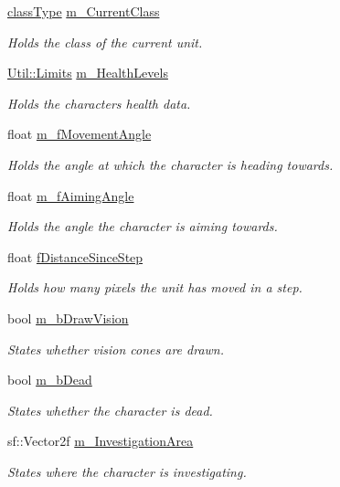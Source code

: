 \begin{DoxyCompactItemize}
\hyperlink{_weapon_8h_ab84a9103ee8e782337e098ae19af7a29}{class\+Type} \hyperlink{class_character_aa130143524b553ddf116e0d4077bcdec}{m\+\_\+\+Current\+Class}
\begin{DoxyCompactList}\small\item\em Holds the class of the current unit. \end{DoxyCompactList}\item 
\hyperlink{struct_util_1_1_limits}{Util\+::\+Limits} \hyperlink{class_character_a944cd240090634db000d5f64ce6345fe}{m\+\_\+\+Health\+Levels}
\begin{DoxyCompactList}\small\item\em Holds the characters health data. \end{DoxyCompactList}\item 
float \hyperlink{class_character_aeb540cb088fdd9d31874cd672d6da8a0}{m\+\_\+f\+Movement\+Angle}
\begin{DoxyCompactList}\small\item\em Holds the angle at which the character is heading towards. \end{DoxyCompactList}\item 
float \hyperlink{class_character_af087fbb16f032166f54f1b8c7d2ac579}{m\+\_\+f\+Aiming\+Angle}
\begin{DoxyCompactList}\small\item\em Holds the angle the character is aiming towards. \end{DoxyCompactList}\item 
float \hyperlink{class_character_af3fba210ee65a1e3792c6bf7388cd8c4}{f\+Distance\+Since\+Step}
\begin{DoxyCompactList}\small\item\em Holds how many pixels the unit has moved in a step. \end{DoxyCompactList}\item 
bool \hyperlink{class_character_a6e68bbc92908c098b35615e7b43ac0b2}{m\+\_\+b\+Draw\+Vision}
\begin{DoxyCompactList}\small\item\em States whether vision cones are drawn. \end{DoxyCompactList}\item 
bool \hyperlink{class_character_a910b476644d4a5c30355d36664b07b5f}{m\+\_\+b\+Dead}
\begin{DoxyCompactList}\small\item\em States whether the character is dead. \end{DoxyCompactList}\item 
sf\+::\+Vector2f \hyperlink{class_character_ae8bb360dd9c4e3cad619182c5baeb8f1}{m\+\_\+\+Investigation\+Area}
\begin{DoxyCompactList}\small\item\em States where the character is investigating. \end{DoxyCompactList}\end{DoxyCompactItemize}
